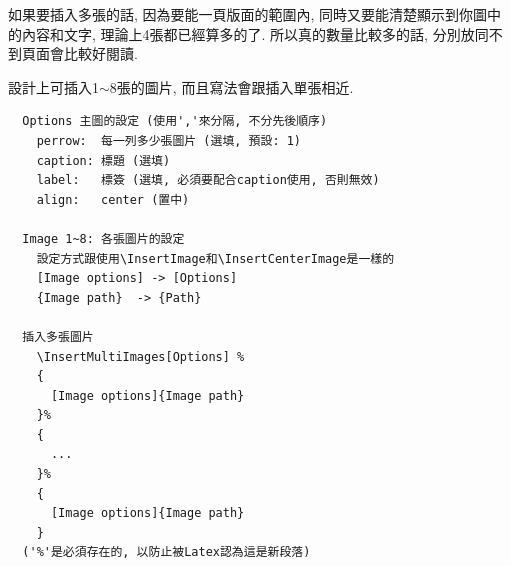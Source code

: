 \newpage
{}

  如果要插入多張的話, 因為要能一頁版面的範圍內, 同時又要能清楚顯示到你圖中的內容和文字, 理論上4張都已經算多的了. 所以真的數量比較多的話, 分別放同不到頁面會比較好閱讀.

  設計上可插入1$\sim$8張的圖片, 而且寫法會跟插入單張相近.

  \begin{framed}
  \begin{verbatim}
  Options 主圖的設定 (使用','來分隔, 不分先後順序)
    perrow:  每一列多少張圖片 (選填, 預設: 1)
    caption: 標題 (選填)
    label:   標簽 (選填, 必須要配合caption使用, 否則無效)
    align:   center (置中)

  Image 1~8: 各張圖片的設定
    設定方式跟使用\InsertImage和\InsertCenterImage是一樣的
    [Image options] -> [Options]
    {Image path}  -> {Path}

  插入多張圖片
    \InsertMultiImages[Options] %
    {
      [Image options]{Image path}
    }%
    {
      ...
    }%
    {
      [Image options]{Image path}
    }
  ('%'是必須存在的, 以防止被Latex認為這是新段落)
  \end{verbatim}
  \end{framed}

  \newpage

